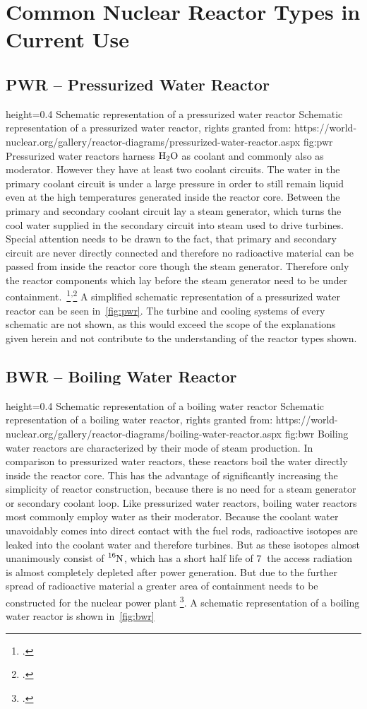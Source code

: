 \chapter{Common Nuclear Reactor Types in Current Use} 
\section{PWR – Pressurized Water Reactor}
    {height=0.4\textheight}
    {Schematic representation of a pressurized water reactor}
    {Schematic representation of a pressurized water reactor, rights granted from: https://world-nuclear.org/gallery/reactor-diagrams/pressurized-water-reactor.aspx}
    {fig:pwr}
Pressurized water reactors harness $\ce{H_{2}O}$ as coolant and commonly also as moderator. However they have at least
two coolant circuits. The water in the primary coolant circuit is under a large pressure in order
to still remain liquid even at the high temperatures generated inside the reactor core. Between the primary
and secondary coolant circuit lay a steam generator, which turns the cool water supplied in the secondary circuit
into steam used to drive turbines. Special attention needs to be drawn to the fact, that primary and secondary
circuit are never directly connected and therefore no radioactive material can be passed from inside the reactor core
though the steam generator. Therefore only the reactor components which lay before the steam generator
need to be under containment.~\footcite{WNPR}\textsuperscript{,}\footcite[14-84]{engHandbook} 
A simplified schematic representation of a pressurized water reactor can be seen in~\ref{fig:pwr}. The
turbine and cooling systems of every schematic are not shown, as this would exceed the scope of the
explanations given herein and not contribute to the understanding of the reactor types shown.
\pagebreak
\section{BWR – Boiling Water Reactor}
    {height=0.4\textheight}
    {Schematic representation of a boiling water reactor}
    {Schematic representation of a boiling water reactor, rights granted from: https://world-nuclear.org/gallery/reactor-diagrams/boiling-water-reactor.aspx}
    {fig:bwr}
Boiling water reactors are characterized by their mode of steam production. In comparison to pressurized
water reactors, these reactors boil the water directly inside the reactor core. This has the advantage
of significantly increasing the simplicity of reactor construction, because there is no need for a steam
generator or secondary coolant loop. Like pressurized water reactors, boiling water reactors most commonly
employ water as their moderator. Because the coolant water unavoidably comes into direct contact with
the fuel rods, radioactive isotopes are leaked into the coolant water and therefore turbines. But 
as these isotopes almost unanimously consist of $\ce{^{16}N}$, which has a short half life of $7 ~$
the access radiation is almost completely depleted after power generation. But due to the further
spread of radioactive material a greater area of containment needs to be constructed for the nuclear
power plant \footcite[85-140]{engHandbook}. A schematic representation of a boiling water reactor
is shown in~\ref{fig:bwr}
\pagebreak

